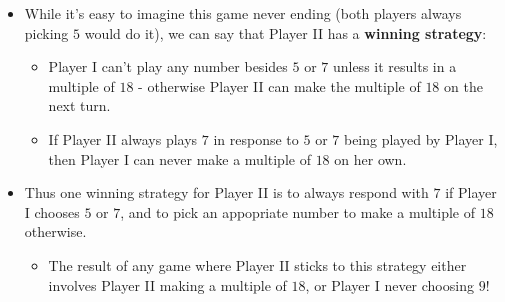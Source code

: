 \documentclass{beamer}
\begin{document}
\begin{frame}
  \begin{itemize}
  \item
    While it's easy to imagine this game never ending (both players always picking $5$ would do it), we can say that Player II has a \textbf{winning strategy}:
    \pause
    \begin{itemize}
      \item Player I can't play any number besides $5$ or $7$ unless it results in a multiple of $18$ - otherwise Player II can make the multiple of $18$ on the next turn.
      \pause
      \item If Player II always plays $7$ in response to $5$ or $7$ being played by Player I, then Player I can never make a multiple of $18$ on her own.
    \end{itemize}
  \pause
  \item 
    Thus one winning strategy for Player II is to always respond with $7$ if Player I chooses $5$ or $7$, and to pick an appopriate number to make a multiple of $18$ otherwise.
  \pause
    \begin{itemize}
      \item 
        The result of any game where Player II sticks to this strategy either involves Player II making a multiple of $18$, or Player I never choosing $9$!
    \end{itemize}
  \end{itemize}
\end{frame}
\end{document}
